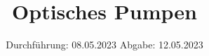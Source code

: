 

\subject{v21}
\title{Optisches Pumpen}
\date{%
  Durchführung: 08.05.2023
  \hspace{3em}
  Abgabe: 12.05.2023
}



\maketitle
\thispagestyle{empty}
\tableofcontents
\newpage






\printbibliography{}


